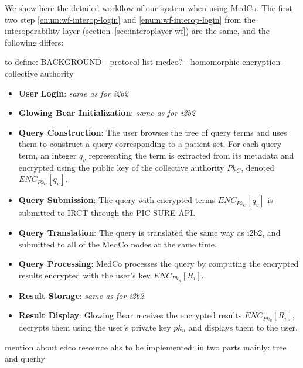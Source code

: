 We show here the detailed workflow of our system when using MedCo.
The first two step \ref{enum:wf-interop-login} and \ref{enum:wf-interop-login} from the interoperability layer (section~\ref{sec:interoplayer-wf}) are the same, and the following differs:




to define: BACKGROUND
- protocol list medco?
- homomorphic encryption
- collective authority

\begin{itemize}
\item \textbf{User Login}: \emph{same as for i2b2}

\item \textbf{Glowing Bear Initialization}: \emph{same as for i2b2}

\item \textbf{Query Construction}:
The user browses the tree of query terms and uses them to construct a query corresponding to a patient set.
For each query term, an integer $q_v$ representing the term is extracted from its metadata and encrypted using the public key of the collective authority $Pk_C$, denoted $ENC_{Pk_C}[q_v]$.

\item \textbf{Query Submission}:
The query with encrypted terms $ENC_{Pk_C}[q_v]$ is submitted to IRCT through the PIC-SURE API.

\item \textbf{Query Translation}:
The query is translated the same way as i2b2, and submitted to all of the MedCo nodes at the same time.

\item \textbf{Query Processing}:
MedCo processes the query by computing the encrypted results encrypted with the user's key $ENC_{Pk_u}[R_i]$.

\item \textbf{Result Storage}: \emph{same as for i2b2}

\item \textbf{Result Display}:
Glowing Bear receives the encrypted results $ENC_{Pk_u}[R_i]$, decrypts them using the user's private key $pk_u$ and displays them to the user.
\end{itemize}

mention about edco resource ahs to be implemented: in two parts mainly: tree and querhy

